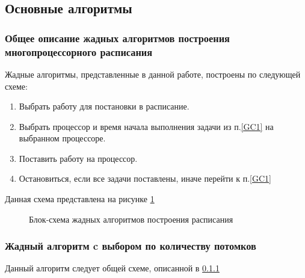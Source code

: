\subsection{Основные алгоритмы}
\subsubsection{Общее описание жадных алгоритмов построения многопроцессорного расписания} \label{algo_template}
Жадные алгоритмы, представленные в данной работе, построены по следующей схеме:
\begin{enumerate}
    \item \label{GC1} Выбрать работу для постановки в расписание.
    \item \label{GC2} Выбрать процессор и время начала выполнения задачи из п.\ref{GC1} на выбранном процессоре.
    \item Поставить работу на процессор.
    \item Остановиться, если все задачи поставлены, иначе перейти к п.\ref{GC1}
\end{enumerate}

Данная схема представлена на рисунке \ref{fig:block-schema}

\begin{figure}[!htbp]
    \caption{Блок-схема жадных алгоритмов построения расписания}
    \label{fig:block-schema}
\end{figure}

\subsubsection{Жадный алгоритм c выбором по количеству потомков} \label{Greedy_GC1}
Данный алгоритм следует общей схеме, описанной в \ref{algo_template}

